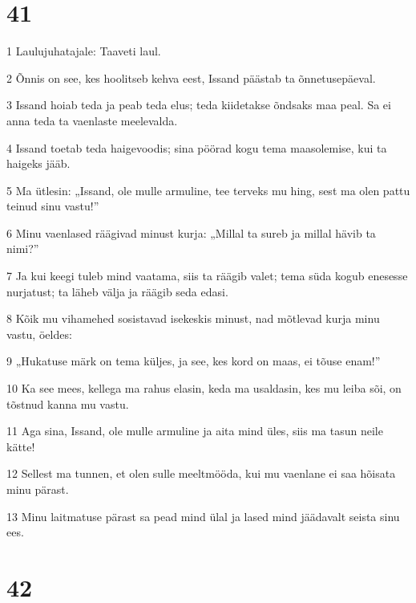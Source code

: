 \chapter{41}

\par 1 Laulujuhatajale: Taaveti laul.
\par 2 Õnnis on see, kes hoolitseb kehva eest, Issand päästab ta õnnetusepäeval.
\par 3 Issand hoiab teda ja peab teda elus; teda kiidetakse õndsaks maa peal. Sa ei anna teda ta vaenlaste meelevalda.
\par 4 Issand toetab teda haigevoodis; sina pöörad kogu tema maasolemise, kui ta haigeks jääb.
\par 5 Ma ütlesin: „Issand, ole mulle armuline, tee terveks mu hing, sest ma olen pattu teinud sinu vastu!”
\par 6 Minu vaenlased räägivad minust kurja: „Millal ta sureb ja millal hävib ta nimi?”
\par 7 Ja kui keegi tuleb mind vaatama, siis ta räägib valet; tema süda kogub enesesse nurjatust; ta läheb välja ja räägib seda edasi.
\par 8 Kõik mu vihamehed sosistavad isekeskis minust, nad mõtlevad kurja minu vastu, öeldes:
\par 9 „Hukatuse märk on tema küljes, ja see, kes kord on maas, ei tõuse enam!”
\par 10 Ka see mees, kellega ma rahus elasin, keda ma usaldasin, kes mu leiba sõi, on tõstnud kanna mu vastu.
\par 11 Aga sina, Issand, ole mulle armuline ja aita mind üles, siis ma tasun neile kätte!
\par 12 Sellest ma tunnen, et olen sulle meeltmööda, kui mu vaenlane ei saa hõisata minu pärast.
\par 13 Minu laitmatuse pärast sa pead mind ülal ja lased mind jäädavalt seista sinu ees.

\chapter{42}

